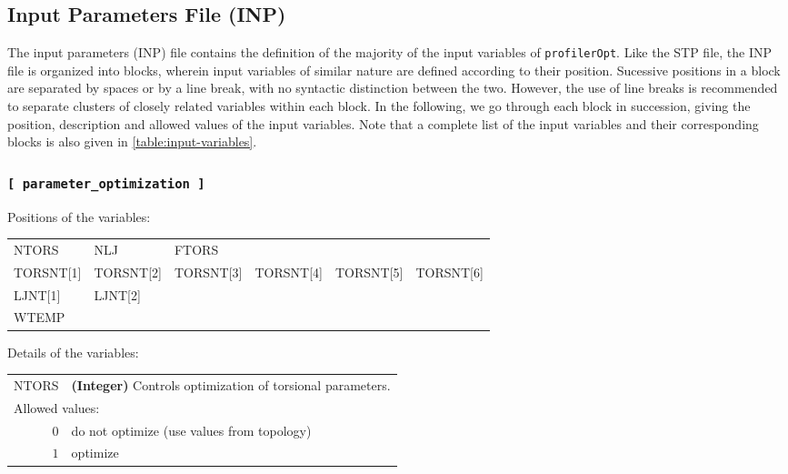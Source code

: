 \documentclass[10pt,a4paper,openany]{memoir}
\numberwithin{equation}{section}
\newcommand{\profileropt}[0]{\texttt{profilerOpt}}
\begin{document}
\subsection{Input Parameters File (INP)}
\label{sec:file-formats-INP}

The input parameters (INP) file contains the definition of the majority of the input variables of \profileropt{}.
Like the STP file, the INP file is organized into blocks, wherein input variables of similar nature are defined according to their position.
Sucessive positions in a block are separated by spaces or by a line break, with no syntactic distinction between the two.
However, the use of line breaks is recommended to separate clusters of closely related variables within each block.
In the following, we go through each block in succession, giving the position, description and allowed values of the input variables.
Note that a complete list of the input variables and their corresponding blocks is also given in \autoref{table:input-variables}.

\subsubsection{\texttt{[~parameter\_optimization~]}}
\label{sec:inp-parameter_optimization}

Positions of the variables:
\begin{center}
  \begin{tabular}{llllll}
    NTORS & NLJ & FTORS & & & \\
    TORSNT[1] & TORSNT[2] & TORSNT[3] & TORSNT[4] & TORSNT[5] & TORSNT[6] \\
    LJNT[1] & LJNT[2] &  & & & \\
    WTEMP
  \end{tabular}
\end{center}

\noindent Details of the variables:
\vspace{2ex}

{
\begin{tabular}{r@{ : }l}
\label{descr:ntors}
     NTORS&\textbf{(Integer)} Controls optimization of torsional parameters.                                                       \\ 
\multicolumn{2}{l}{Allowed values:} \\ 
     \(0\)&do not optimize (use values from topology)                                                           \\ 
     \(1\)&optimize                                                                                             \\ 
\end{tabular}
\vspace{1ex}
}
\end{document}
